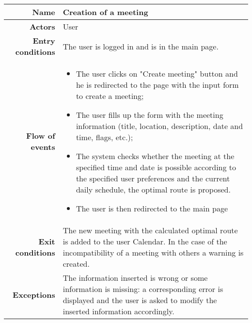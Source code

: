 \begin{center}
\begin{tabular}{r|p{7cm}}
\bf\large Name&\bf\large Creation of a meeting\\
\hline
\hline
\bf Actors&User\\
\hline
\bf Entry conditions&The user is logged in and is in the main page.\\
\hline
\bf Flow of events&
\begin{itemize}
\item The user clicks on "Create meeting" button and he is redirected to the page with the input form to create a meeting; 
\item  The user ﬁlls up the form with the meeting information (title, location, description, date and time, flags, etc.); 
\item  The system checks whether the meeting at the specified time and date is possible according to the speciﬁed user preferences and the current daily schedule, the optimal route is proposed.
\item The user is then redirected to the main page
\end{itemize}
\\
\hline
\bf Exit conditions&The new meeting with the calculated optimal route is added to the user Calendar. In the case of the incompatibility of a meeting with others a warning is created.\\
\hline
\bf Exceptions&The information inserted is wrong or some information is missing: a corresponding error is displayed and the user is asked to modify the inserted information accordingly.
\\
\hline

\end{tabular}
\end{center}